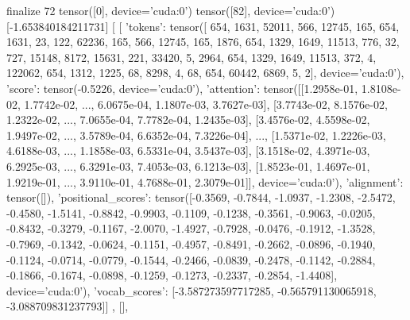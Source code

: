 finalize  72 tensor([0], device='cuda:0') tensor([82], device='cuda:0') [-1.653840184211731] [
    [   
        {'tokens': tensor([   654,   1631,  52011,    566,  12745,    165,    654,   1631,     23,
           122,  62236,    165,    566,  12745,    165,   1876,    654,   1329,
          1649,  11513,    776,     32,    727,  15148,   8172,  15631,    221,
         33420,      5,   2964,    654,   1329,   1649,  11513,    372,      4,
        122062,    654,   1312,   1225,     68,   8298,      4,     68,    654,
         60442,   6869,      5,      2], device='cuda:0'), 'score': tensor(-0.5226, device='cuda:0'), 'attention': tensor([[1.2958e-01, 1.8108e-02, 1.7742e-02,  ..., 6.0675e-04, 1.1807e-03,
         3.7627e-03],
        [3.7743e-02, 8.1576e-02, 1.2322e-02,  ..., 7.0655e-04, 7.7782e-04,
         1.2435e-03],
        [3.4576e-02, 4.5598e-02, 1.9497e-02,  ..., 3.5789e-04, 6.6352e-04,
         7.3226e-04],
        ...,
        [1.5371e-02, 1.2226e-03, 4.6188e-03,  ..., 1.1858e-03, 6.5331e-04,
         3.5437e-03],
        [3.1518e-02, 4.3971e-03, 6.2925e-03,  ..., 6.3291e-03, 7.4053e-03,
         6.1213e-03],
        [1.8523e-01, 1.4697e-01, 1.9219e-01,  ..., 3.9110e-01, 4.7688e-01,
         2.3079e-01]], device='cuda:0'), 'alignment': tensor([]), 'positional_scores': tensor([-0.3569, -0.7844, -1.0937, -1.2308, -2.5472, -0.4580, -1.5141, -0.8842,
        -0.9903, -0.1109, -0.1238, -0.3561, -0.9063, -0.0205, -0.8432, -0.3279,
        -0.1167, -2.0070, -1.4927, -0.7928, -0.0476, -0.1912, -1.3528, -0.7969,
        -0.1342, -0.0624, -0.1151, -0.4957, -0.8491, -0.2662, -0.0896, -0.1940,
        -0.1124, -0.0714, -0.0779, -0.1544, -0.2466, -0.0839, -0.2478, -0.1142,
        -0.2884, -0.1866, -0.1674, -0.0898, -0.1259, -0.1273, -0.2337, -0.2854,
        -1.4408], device='cuda:0'), 'vocab_scores': [-3.587273597717285, -0.565791130065918, -3.088709831237793]}]
        ,
        [], 
